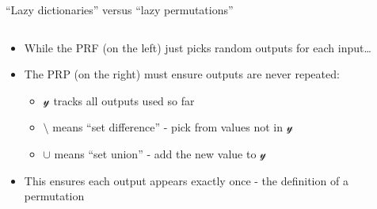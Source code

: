 \documentclass[aspectratio=169, lualatex, handout]{beamer}
\begin{document}
\begin{frame}{``Lazy dictionaries'' versus ``lazy permutations''}
	\begin{columns}[c]
		\begin{column}{0.5\textwidth}
			\begin{itemize}
				\item While the PRF (on the left) just picks random outputs for each input\ldots
				\item The PRP (on the right) must ensure outputs are never repeated:
				      \begin{itemize}
					      \item $\mathcal{y}$ tracks all outputs used so far
					      \item $\setminus$ means ``set difference'' - pick from values not in $\mathcal{y}$
					      \item $\cup$ means ``set union'' - add the new value to $\mathcal{y}$
				      \end{itemize}
				\item This ensures each output appears exactly once - the definition of a permutation
			\end{itemize}
		\end{column}
		\begin{column}{0.5\textwidth}
			\begin{center}
			\end{center}
		\end{column}
	\end{columns}
\end{frame}
\end{document}
